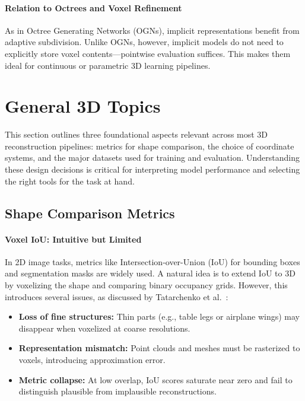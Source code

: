 \paragraph{Relation to Octrees and Voxel Refinement}
As in Octree Generating Networks (OGNs), implicit representations benefit from adaptive subdivision. Unlike OGNs, however, implicit models do not need to explicitly store voxel contents—pointwise evaluation suffices. This makes them ideal for continuous or parametric 3D learning pipelines.

\newpage

\section{General 3D Topics}
\label{sec:chapter23_general_3d_topics}

This section outlines three foundational aspects relevant across most 3D reconstruction pipelines: metrics for shape comparison, the choice of coordinate systems, and the major datasets used for training and evaluation. Understanding these design decisions is critical for interpreting model performance and selecting the right tools for the task at hand.

\subsection{Shape Comparison Metrics}
\label{subsec:chapter23_shape_metrics}

\paragraph{Voxel IoU: Intuitive but Limited}
In 2D image tasks, metrics like Intersection-over-Union (IoU) for bounding boxes and segmentation masks are widely used. A natural idea is to extend IoU to 3D by voxelizing the shape and comparing binary occupancy grids. However, this introduces several issues, as discussed by Tatarchenko et al.\ \cite{tatarchenko2019_singleview}:

\begin{itemize}
    \item \textbf{Loss of fine structures:} Thin parts (e.g., table legs or airplane wings) may disappear when voxelized at coarse resolutions.
    \item \textbf{Representation mismatch:} Point clouds and meshes must be rasterized to voxels, introducing approximation error.
    \item \textbf{Metric collapse:} At low overlap, IoU scores saturate near zero and fail to distinguish plausible from implausible reconstructions.
\end{itemize}


